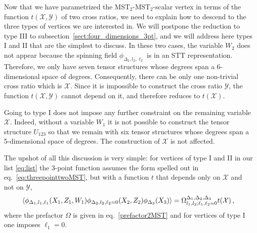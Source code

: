 \documentclass{article}
\begin{document}
Now that we have parametrized the MST$_2$-MST$_2$-scalar vertex in terms 
of the function $t(\mathcal{X},\mathcal{Y})$ of two cross ratios, we need to explain how 
to descend to the three types of vertices we are interested in. We will postpone the reduction to type III to subsection~\ref{sect:four_dimensions_3pt}, and we will address here types I and II that are the simplest to discuss. 
In these two cases, the variable $W_2$ does not appear because the spinning field $\phi_{\Delta_2,
l_2,\ell_2}$ is in an STT representation. Therefore,
we only have seven tensor structures whose degrees span a 6-dimensional space of degrees. 
Consequently, there can be only one non-trivial cross ratio which is $\mathcal{X}$. Since 
it is impossible to construct the cross ratio $\mathcal{Y}$, the function $t(\mathcal{X},
\mathcal{Y})$ cannot depend on it, and therefore reduces to $t(\mathcal{X})$.

Going to type I does not impose any further constraint on the remaining variable 
$\mathcal{X}$. Indeed, without a variable $W_1$ it is not possible to construct the
tensor structure $U_{123}$ so that we remain with six tensor structures whose degrees
span a 5-dimensional space of degrees. The construction of $\mathcal{X}$ is not affected. 

The upshot of all this discussion is very simple: for vertices of type I and II in our 
list \eqref{eq:list} the 3-point function assumes the form spelled out in eq.\
\eqref{eq:threepointtwoMST}, but with a function $t$ that depends only on 
$\mathcal{X}$ and not on $\mathcal{Y}$, 
\begin{equation}
    \expval{\phi_{\Delta_1,l_1,\ell_1}(X_1,Z_1,W_1)\phi_{\Delta_2,l_2,\ell_2=0}
    (X_2,Z_2)\phi_{\Delta_3}(X_3)}=\Omega^{\Delta_1,\Delta_2,\Delta_3}_{l_1,l_2;
    \ell_1,\ell_2=0} t(\mathcal{X})\,,
    \label{eq:threepointtwoMSTonecrossratio}
\end{equation}
where the prefactor $\Omega$ is given in eq.\ \eqref{prefactor2MST} and
for vertices of type I one imposes $\ell_1 = 0$. 
\medskip 
\end{document}
